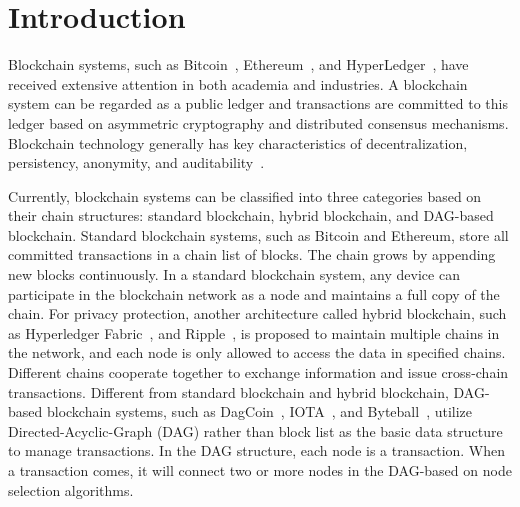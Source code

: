 \documentclass[acmsmall]{acmart}
\begin{document}



\maketitle

%
\section{Introduction}
\label{sec:Introduction}

Blockchain systems, such as Bitcoin~\cite{nakamoto2019bitcoin}, Ethereum~\cite{buterin2014next}, and HyperLedger~\cite{cachin2016architecture}, have received extensive attention in both academia and industries. A blockchain system can be regarded as a public ledger and transactions are committed to this ledger based on asymmetric cryptography and distributed consensus mechanisms. Blockchain technology generally has key characteristics of decentralization, persistency, anonymity, and auditability~\cite{zheng2017overview}.

Currently, blockchain systems can be classified into three categories based on their chain structures: standard blockchain, hybrid blockchain, and DAG-based blockchain. Standard blockchain systems, such as Bitcoin and Ethereum, store all committed transactions in a chain list of blocks. The chain grows by appending new blocks continuously. In a standard blockchain system, any device can participate in the blockchain network as a node and maintains a full copy of the chain. For privacy protection, another architecture called hybrid blockchain, such as Hyperledger Fabric~\cite{cachin2016architecture}, and Ripple~\cite{armknecht2015ripple}, is proposed to maintain multiple chains in the network, and each node is only allowed to access the data in specified chains. Different chains cooperate together to exchange information and issue cross-chain transactions. 
Different from standard blockchain and hybrid blockchain, DAG-based blockchain systems, such as DagCoin~\cite{lerner2015dagcoin}, IOTA~\cite{popov2016tangle}, and Byteball~\cite{churyumov2016byteball}, utilize Directed-Acyclic-Graph (DAG) rather than block list as the basic data structure to manage transactions. In the DAG structure, each node is a transaction. When a transaction comes, it will connect two or more nodes in the DAG-based on node selection algorithms.
\end{document}
